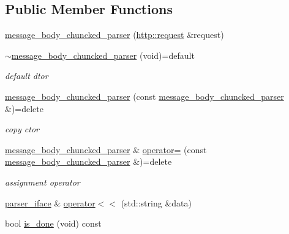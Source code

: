 \subsection*{Public Member Functions}
\begin{DoxyCompactItemize}
\item 
\hyperlink{classnetflex_1_1parsing_1_1message__body__chuncked__parser_a14516267172bd9388292dab58e2d02f3}{message\+\_\+body\+\_\+chuncked\+\_\+parser} (\hyperlink{classnetflex_1_1http_1_1request}{http\+::request} \&request)
\item 
\mbox{\label{classnetflex_1_1parsing_1_1message__body__chuncked__parser_a366af46ec4c3c3f70edf2024734a43d0}} 
\hyperlink{classnetflex_1_1parsing_1_1message__body__chuncked__parser_a366af46ec4c3c3f70edf2024734a43d0}{$\sim$message\+\_\+body\+\_\+chuncked\+\_\+parser} (void)=default
\begin{DoxyCompactList}\small\item\em default dtor \end{DoxyCompactList}\item 
\mbox{\label{classnetflex_1_1parsing_1_1message__body__chuncked__parser_a9a924a41f4a72833331a0120d2045eaa}} 
\hyperlink{classnetflex_1_1parsing_1_1message__body__chuncked__parser_a9a924a41f4a72833331a0120d2045eaa}{message\+\_\+body\+\_\+chuncked\+\_\+parser} (const \hyperlink{classnetflex_1_1parsing_1_1message__body__chuncked__parser}{message\+\_\+body\+\_\+chuncked\+\_\+parser} \&)=delete
\begin{DoxyCompactList}\small\item\em copy ctor \end{DoxyCompactList}\item 
\mbox{\label{classnetflex_1_1parsing_1_1message__body__chuncked__parser_ab10ac43d89941c4521ab9fbba8fab540}} 
\hyperlink{classnetflex_1_1parsing_1_1message__body__chuncked__parser}{message\+\_\+body\+\_\+chuncked\+\_\+parser} \& \hyperlink{classnetflex_1_1parsing_1_1message__body__chuncked__parser_ab10ac43d89941c4521ab9fbba8fab540}{operator=} (const \hyperlink{classnetflex_1_1parsing_1_1message__body__chuncked__parser}{message\+\_\+body\+\_\+chuncked\+\_\+parser} \&)=delete
\begin{DoxyCompactList}\small\item\em assignment operator \end{DoxyCompactList}\item 
\hyperlink{classnetflex_1_1parsing_1_1parser__iface}{parser\+\_\+iface} \& \hyperlink{classnetflex_1_1parsing_1_1message__body__chuncked__parser_a18d0ab86d63bb22fb40663d06fcb12e1}{operator$<$$<$} (std\+::string \&data)
\item 
bool \hyperlink{classnetflex_1_1parsing_1_1message__body__chuncked__parser_ac5c76b0a25903f6ab1fd4050446175b4}{is\+\_\+done} (void) const
\end{DoxyCompactItemize}
